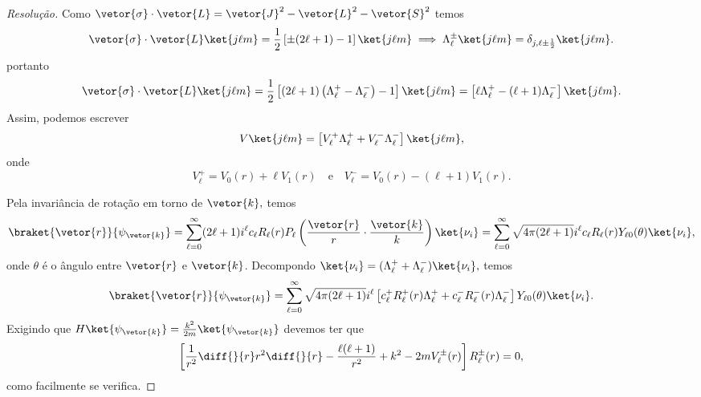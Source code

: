 \begin{proof}[Resolução]
   Como \(\vetor{\sigma} \cdot \vetor{L} = \vetor{J}^2 - \vetor{L}^2 - \vetor{S}^2\) temos
   \begin{equation*}
      \vetor{\sigma} \cdot \vetor{L} \ket{j \ell m} = \frac12 \left[\pm(2\ell + 1) - 1\right] \ket{j \ell m}
      \implies \Lambda_{\ell}^{\pm}\ket{j \ell m} = \delta_{j, \ell \pm \frac12} \ket{j \ell m}.
   \end{equation*}
   portanto
   \begin{equation*}
      \vetor{\sigma} \cdot \vetor{L} \ket{j \ell m} = \frac12\left[(2\ell + 1) \left(\Lambda_\ell^+ - \Lambda_\ell^-\right) - 1\right]\ket{j \ell m} = \left[\ell \Lambda_\ell^+ - (\ell + 1)\Lambda_\ell^-\right]\ket{j \ell m}.
   \end{equation*}
   Assim, podemos escrever
   \begin{equation*}
      V\ket{j\ell m} = \left[V^+_\ell \Lambda^+_\ell + V^-_{\ell} \Lambda^{-}_\ell\right]\ket{j\ell m},
   \end{equation*}
   onde 
   \begin{equation*}
      V^+_\ell = V_0(r) + \ell V_1(r)
      \quad\text{e}\quad
      V^-_\ell = V_0(r) - (\ell+1) V_1(r).
   \end{equation*}

   Pela invariância de rotação em torno de \(\vetor{k},\) temos
   \begin{equation*}
      \braket{\vetor{r}}{\psi_{\vetor{k}}} = \sum_{\ell = 0}^\infty (2\ell + 1)i^\ell c_\ell R_\ell(r) P_\ell\left(\frac{\vetor{r}}{r}\cdot \frac{\vetor{k}}{k}\right) \ket{\nu_i} = \sum_{\ell = 0}^\infty \sqrt{4\pi (2\ell + 1)} i^\ell c_\ell R_{\ell}(r) Y_{\ell 0}(\theta) \ket{\nu_i},
   \end{equation*}
   onde \(\theta\) é o ângulo entre \(\vetor{r}\) e \(\vetor{k}\). Decompondo \(\ket{\nu_i} = (\Lambda_\ell^{+} + \Lambda_\ell^{-})\ket{\nu_i},\) temos
   \begin{equation*}
      \braket{\vetor{r}}{\psi_{\vetor{k}}} = \sum_{\ell = 0}^\infty \sqrt{4\pi (2\ell + 1)} i^{\ell} \left[c_\ell^+R_\ell^{+}(r) \Lambda_{\ell}^+ + c_\ell^{-} R_{\ell}^{-}(r) \Lambda_{\ell}^-\right]Y_{\ell 0}(\theta) \ket{\nu_i}.
   \end{equation*}
   Exigindo que \(H \ket{\psi_{\vetor{k}}} = \frac{k^2}{2m}\ket{\psi_{\vetor{k}}}\) devemos ter que
   \begin{equation*}
      \left[\frac{1}{r^2} \diff{}{r}r^2 \diff{}{r} - \frac{\ell (\ell + 1)}{r^2} + k^2 - 2m V_{\ell}^{\pm}(r)\right]R_{\ell}^{\pm}(r) = 0,
   \end{equation*}
   como facilmente se verifica.


\end{proof}

